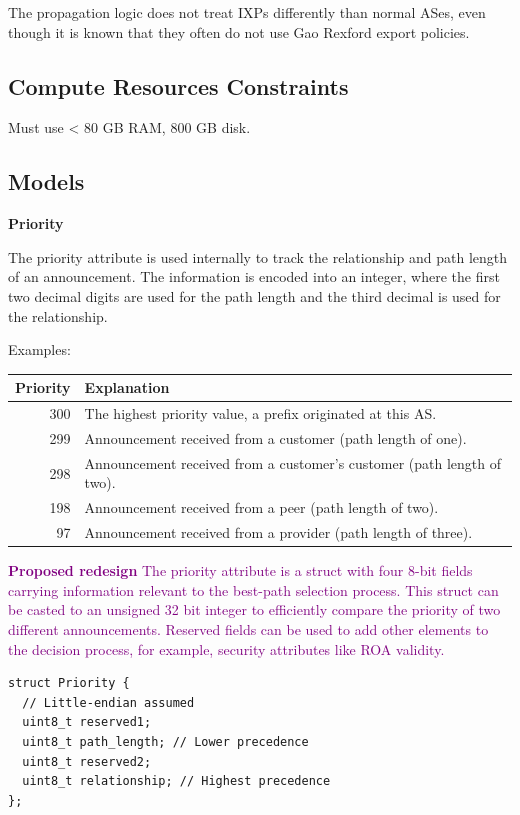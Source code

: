 \documentclass[letterpaper]{article}
\begin{document}
The propagation logic does not treat IXPs differently than normal
ASes, even though it is known that they often do not use Gao Rexford
export policies.

\hypertarget{constraints}{%
\subsection{Compute Resources Constraints}\label{constraints}}

Must use \textless{} 80 GB RAM, 800 GB disk.

\hypertarget{models}{%
\subsection{Models}\label{models}}


\textbf{Priority}

The priority attribute is used internally to track the relationship and path
length of an announcement. The information is encoded into an integer, where
the first two decimal digits are used for the path length and the third decimal
is used for the relationship. 

Examples:

\begin{longtable}[]{@{}r|l@{}}
\toprule
\textbf{Priority} & \textbf{Explanation} \tabularnewline
\endhead
\midrule
300 & The highest priority value, a prefix originated at this AS. \tabularnewline
299 & Announcement received from a customer (path length of one). \tabularnewline
298 & Announcement received from a customer's customer (path length of two). \tabularnewline
198 & Announcement received from a peer (path length of two). \tabularnewline
97 & Announcement received from a provider (path length of three). \tabularnewline
\bottomrule
\end{longtable}

\textcolor{purple}{
\textbf{Proposed redesign}
  The priority attribute is a struct with four 8-bit fields carrying information
  relevant to the best-path selection process. This struct can be casted to an
  unsigned 32 bit integer to efficiently compare the priority of two different
  announcements. Reserved fields can be used to add other elements to the
  decision process, for example, security attributes like ROA validity.
}

\begin{verbatim}
struct Priority {
  // Little-endian assumed
  uint8_t reserved1;
  uint8_t path_length; // Lower precedence
  uint8_t reserved2;
  uint8_t relationship; // Highest precedence
};
\end{verbatim}
\end{document}
